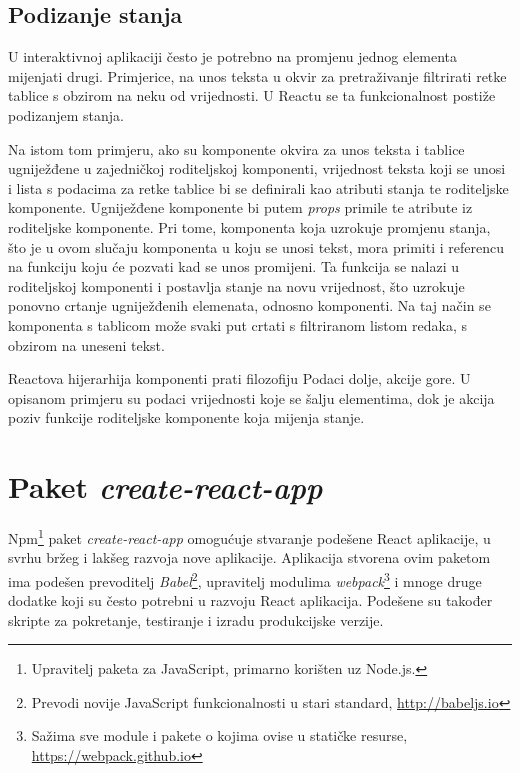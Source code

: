 \documentclass[times, utf8, zavrsni, numeric]{fer}
\begin{document}
\subsection{Podizanje stanja} \label{sec:lifting_state}

U interaktivnoj aplikaciji često je potrebno na promjenu jednog elementa mijenjati drugi.
Primjerice, na unos teksta u okvir za pretraživanje filtrirati retke tablice s obzirom na neku od vrijednosti.
U Reactu se ta funkcionalnost postiže podizanjem stanja\citep{reactDocsLiftStateUp}.

Na istom tom primjeru, ako su komponente okvira za unos teksta i tablice ugniježđene u zajedničkoj roditeljskoj komponenti, vrijednost teksta koji se unosi i lista s podacima za retke tablice bi se definirali kao atributi stanja te roditeljske komponente.
Ugniježđene komponente bi putem \emph{props} primile te atribute iz roditeljske komponente.
Pri tome, komponenta koja uzrokuje promjenu stanja, što je u ovom slučaju komponenta u koju se unosi tekst, mora primiti i referencu na funkciju koju će pozvati kad se unos promijeni.
Ta funkcija se nalazi u roditeljskoj komponenti i postavlja stanje na novu vrijednost, što uzrokuje ponovno crtanje ugniježđenih elemenata, odnosno komponenti.
Na taj način se komponenta s tablicom može svaki put crtati s filtriranom listom redaka, s obzirom na uneseni tekst.

Reactova hijerarhija komponenti prati filozofiju \glqq Podaci dolje, akcije gore\grqq \break {}.
U opisanom primjeru su podaci vrijednosti koje se šalju elementima, dok je akcija poziv funkcije roditeljske komponente koja mijenja stanje.

\newpage


\section{Paket \emph{create-react-app}}

Npm\footnote{Upravitelj paketa za JavaScript, primarno korišten uz Node.js.} paket \emph{create-react-app} omogućuje stvaranje podešene React aplikacije, u svrhu bržeg i lakšeg razvoja nove aplikacije.
Aplikacija stvorena ovim paketom ima podešen prevoditelj \emph{Babel}\footnote{Prevodi novije JavaScript funkcionalnosti u stari standard, \url{http://babeljs.io} }, upravitelj modulima \emph{webpack}\footnote{Sažima sve module i pakete o kojima ovise u statičke resurse, \url{https://webpack.github.io} } i mnoge druge dodatke koji su često potrebni u razvoju React aplikacija\citep{createReactAppGithub}.
Podešene su također skripte za pokretanje, testiranje i izradu produkcijske verzije.
\end{document}
